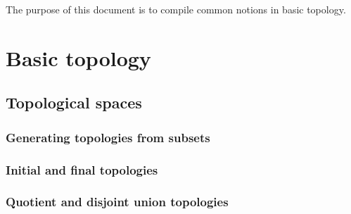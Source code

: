 \nocite{*}

The purpose of this document is to compile common notions in basic topology.

\section{Basic topology}

\subsection{Topological spaces}




\subsubsection{Generating topologies from subsets}









\subsubsection{Initial and final topologies}





\subsubsection{Quotient and disjoint union topologies}

